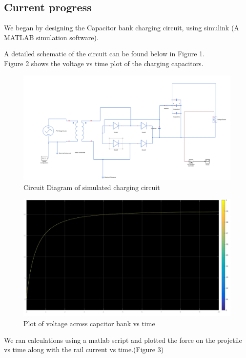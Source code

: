 \documentclass[twocolumn]{article}
\begin{document}
\subsection*{\textbf{Current progress}} 
We began by designing the Capacitor bank charging circuit, using simulink (A MATLAB simulation software).

A detailed schematic of the circuit can be found below in Figure 1.
	\\
	
Figure 2 shows the voltage vs time plot of the charging capacitors.
	
\begin{figure}[htp]
	\caption{Circuit Diagram of simulated charging circuit}
	\includegraphics[width=\linewidth]{Circuit.png}
\end{figure}
	
	
\begin{figure}[h]
	\caption{Plot of voltage across capcitor bank vs time }
	\includegraphics[width=\linewidth]{charging.jpg}
\end{figure}
		
	
We ran calculations using a matlab script and plotted the force on the projetile vs time along with the rail current vs time.(Figure 3)
\end{document}
